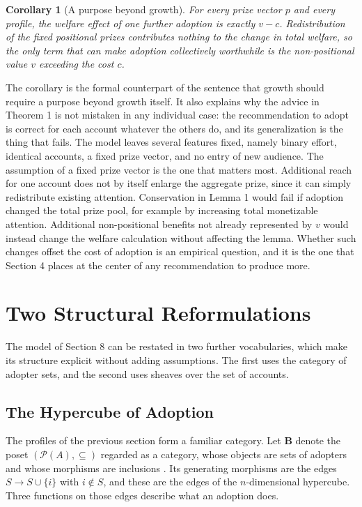 \documentclass[12pt]{article}
\theoremstyle{plain}
\newtheorem{corollary}{Corollary}
\theoremstyle{definition}
\begin{document}
\begin{corollary}[A purpose beyond growth]
For every prize vector $p$ and every profile, the welfare effect of one further adoption is exactly $v-c$. Redistribution of the fixed positional prizes contributes nothing to the change in total welfare, so the only term that can make adoption collectively worthwhile is the non-positional value $v$ exceeding the cost $c$.
\end{corollary}

The corollary is the formal counterpart of the sentence that growth should require a purpose beyond growth itself. It also explains why the advice in Theorem 1 is not mistaken in any individual case: the recommendation to adopt is correct for each account whatever the others do, and its generalization is the thing that fails. The model leaves several features fixed, namely binary effort, identical accounts, a fixed prize vector, and no entry of new audience. The assumption of a fixed prize vector is the one that matters most. Additional reach for one account does not by itself enlarge the aggregate prize, since it can simply redistribute existing attention. Conservation in Lemma 1 would fail if adoption changed the total prize pool, for example by increasing total monetizable attention. Additional non-positional benefits not already represented by $v$ would instead change the welfare calculation without affecting the lemma. Whether such changes offset the cost of adoption is an empirical question, and it is the one that Section 4 places at the center of any recommendation to produce more.

\section{Two Structural Reformulations}

The model of Section 8 can be restated in two further vocabularies, which make its structure explicit without adding assumptions. The first uses the category of adopter sets, and the second uses sheaves over the set of accounts.

\subsection{The Hypercube of Adoption}

The profiles of the previous section form a familiar category. Let $\mathbf{B}$ denote the poset $(\mathcal P(A),\subseteq)$ regarded as a category, whose objects are sets of adopters and whose morphisms are inclusions \cite{maclane1998}. Its generating morphisms are the edges $S\to S\cup\{i\}$ with $i\notin S$, and these are the edges of the $n$-dimensional hypercube. Three functions on those edges describe what an adoption does.
\end{document}
